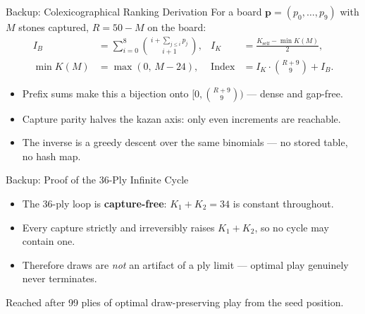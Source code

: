 \documentclass[aspectratio=169]{beamer}
\begin{document}
\begin{frame}{Backup: Colexicographical Ranking Derivation}
  For a board $\mathbf{p}=(p_0,\dots,p_9)$ with $M$ stones captured, $R=50-M$ on the board:
  \begin{align*}
    I_B &= \sum_{i=0}^{8}\binom{\,i+\sum_{j\le i}p_j\,}{\,i+1\,}, &
    I_K &= \frac{K_{\text{self}}-\min K(M)}{2}, \\
    \min K(M) &= \max(0,\,M-24), &
    \mathrm{Index} &= I_K\cdot\binom{R+9}{9}+I_B.
  \end{align*}
  \begin{itemize}
    \item Prefix sums make this a bijection onto $\big[0,\binom{R+9}{9}\big)$ --- dense and gap-free.
    \item Capture parity halves the kazan axis: only even increments are reachable.
    \item The inverse is a greedy descent over the same binomials --- no stored table, no hash map.
  \end{itemize}
\end{frame}

\begin{frame}{Backup: Proof of the 36-Ply Infinite Cycle}
  \centering

  \vspace{0.4cm}
  \begin{itemize}
    \item The 36-ply loop is \textbf{capture-free}: $K_1+K_2 = 34$ is constant throughout.
    \item Every capture strictly and irreversibly raises $K_1+K_2$, so no cycle may contain one.
    \item Therefore draws are \emph{not} an artifact of a ply limit --- optimal play genuinely never terminates.
  \end{itemize}
  \vspace{0.2cm}
  {\scriptsize\color{cMuted} Reached after 99 plies of optimal draw-preserving play from the seed position.}
\end{frame}
\end{document}
